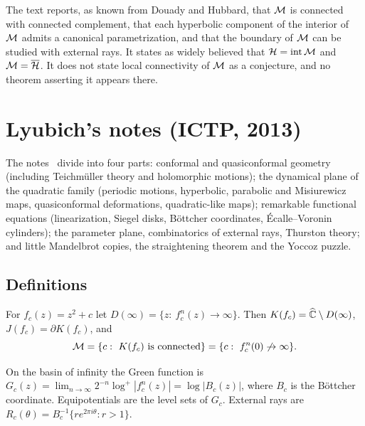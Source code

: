 \begin{remark}
The text reports, as known from Douady and Hubbard, that $\mathcal M$ is connected with
connected complement, that each hyperbolic component of the interior of $\mathcal M$ admits a
canonical parametrization, and that the boundary of $\mathcal M$ can be studied with external
rays.  It states as widely believed that $\mathcal H=\operatorname{int}\mathcal M$ and
$\mathcal M=\overline{\mathcal H}$.  It does not state local connectivity of $\mathcal M$ as a
conjecture, and no theorem asserting it appears there.
\end{remark}

\section{Lyubich's notes (ICTP, 2013)}
\label{sec:digest-lyubich-notes}

The notes~\cite{LyubichNotes} divide into four parts: conformal and quasiconformal
geometry (including Teichmüller theory and holomorphic motions); the dynamical
plane of the quadratic family (periodic motions, hyperbolic, parabolic and
Misiurewicz maps, quasiconformal deformations, quadratic-like maps); remarkable
functional equations (linearization, Siegel disks, Böttcher coordinates,
Écalle--Voronin cylinders); the parameter plane, combinatorics of external rays,
Thurston theory; and little Mandelbrot copies, the straightening theorem and the
Yoccoz puzzle.

\subsection*{Definitions}

\begin{definition}
\label{def:lyubich-basic}
For $f_c(z)=z^2+c$ let $D(\infty)=\{z:\ f_c^n(z)\to\infty\}$.  Then
$K(f_c)=\widehat{\mathbb C}\setminus D(\infty)$, $J(f_c)=\partial K(f_c)$, and
\[
 \mathcal M=\{c:\ K(f_c)\text{ is connected}\}=\{c:\ f_c^n(0)\not\to\infty\}.
\]
\end{definition}

\begin{definition}
\label{def:lyubich-green}
On the basin of infinity the Green function is
$G_c(z)=\lim_{n\to\infty}2^{-n}\log^+|f_c^n(z)|=\log|B_c(z)|$, where $B_c$ is the
Böttcher coordinate.  Equipotentials are the level sets of $G_c$.  External rays are
$R_c(\theta)=B_c^{-1}\{re^{2\pi i\theta}:r>1\}$.
\end{definition}

